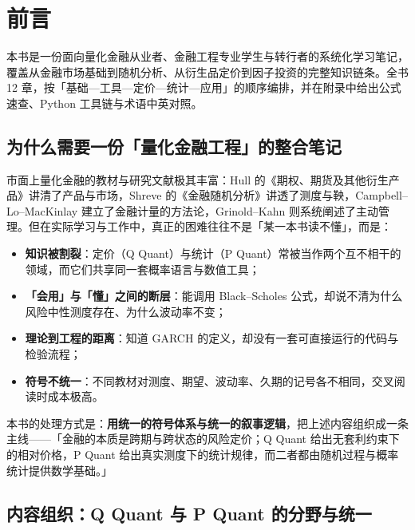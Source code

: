 \chapter*{前言}
\thispagestyle{frontstyle}

本书是一份面向量化金融从业者、金融工程专业学生与转行者的系统化学习笔记，覆盖从金融市场基础到随机分析、从衍生品定价到因子投资的完整知识链条。全书 12 章，按「基础—工具—定价—统计—应用」的顺序编排，并在附录中给出公式速查、Python 工具链与术语中英对照。

\section*{为什么需要一份「量化金融工程」的整合笔记}

市面上量化金融的教材与研究文献极其丰富：Hull 的《期权、期货及其他衍生产品》讲清了产品与市场，Shreve 的《金融随机分析》讲透了测度与鞅，Campbell--Lo--MacKinlay 建立了金融计量的方法论，Grinold--Kahn 则系统阐述了主动管理。但在实际学习与工作中，真正的困难往往不是「某一本书读不懂」，而是：

\begin{itemize}[leftmargin=1.8em]
  \item \textbf{知识被割裂}：定价（Q Quant）与统计（P Quant）常被当作两个互不相干的领域，而它们共享同一套概率语言与数值工具；
  \item \textbf{「会用」与「懂」之间的断层}：能调用 Black--Scholes 公式，却说不清为什么风险中性测度存在、为什么波动率不变；
  \item \textbf{理论到工程的距离}：知道 GARCH 的定义，却没有一套可直接运行的代码与检验流程；
  \item \textbf{符号不统一}：不同教材对测度、期望、波动率、久期的记号各不相同，交叉阅读时成本极高。
\end{itemize}

本书的处理方式是：\textbf{用统一的符号体系与统一的叙事逻辑}，把上述内容组织成一条主线——「金融的本质是跨期与跨状态的风险定价；Q Quant 给出无套利约束下的相对价格，P Quant 给出真实测度下的统计规律，而二者都由随机过程与概率统计提供数学基础。」

\section*{内容组织：Q Quant 与 P Quant 的分野与统一}

